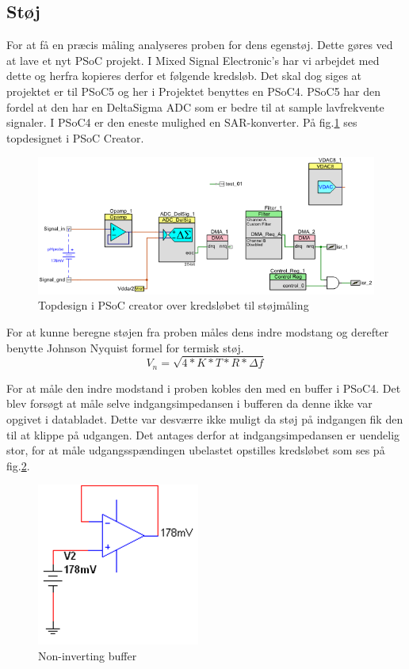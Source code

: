  

\subsection{Støj}

For at få en præcis måling analyseres proben for dens egenstøj. Dette gøres ved at lave et nyt PSoC projekt. I Mixed Signal Electronic's har vi arbejdet med dette og herfra kopieres derfor et følgende kredsløb. Det skal dog siges at projektet er til PSoC5 og her i Projektet benyttes en PSoC4. PSoC5 har den fordel at den har en DeltaSigma ADC som er bedre til at sample lavfrekvente signaler. I PSoC4 er den eneste mulighed en SAR-konverter. På fig.\ref{photo:Topdesign_stoj} ses topdesignet i PSoC Creator. 
 \begin{figure}[H]
	\centering 
	\includegraphics[scale=0.8]{HardwareArkitektur/Sensore/pH_probe_billeder/Topdesign_stoj.png}
	\caption{Topdesign i PSoC creator over kredsløbet til støjmåling}
	\label{photo:Topdesign_stoj}
\end{figure} 

For at kunne beregne støjen fra proben måles dens indre modstang og derefter benytte Johnson Nyquist formel for termisk støj. 
$$ V_n = \sqrt{4*K*T*R*\Delta f} $$

For at måle den indre modstand i proben kobles den med en buffer i PSoC4. Det blev forsøgt at måle selve indgangsimpedansen i bufferen da denne ikke var opgivet i databladet. Dette var desværre ikke muligt da støj på indgangen fik den til at klippe på udgangen. Det antages derfor at indgangsimpedansen er uendelig stor, for at måle udgangsspændingen ubelastet opstilles kredsløbet som ses på fig.\ref{photo:Non_inv_buf}. 

 \begin{figure}[H]
	\centering 
	\includegraphics[scale=1]{HardwareArkitektur/Sensore/pH_probe_billeder/Non_inverting_buffer.png}
	\caption{Non-inverting buffer}
	\label{photo:Non_inv_buf}
\end{figure} 

